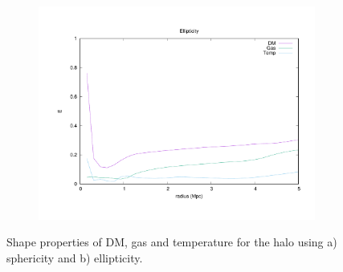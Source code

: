\documentclass[journal]{IEEEtran}
\begin{document}
\begin{figure}[t]
{%
	\begin{subfigure}[t]{0.37\textwidth}
		\centering
		\includegraphics[width=\linewidth]{Ellipticity}
	\end{subfigure}
}
\caption{Shape properties of DM, gas and temperature for the halo using a) sphericity and b) ellipticity.}
\label{fig:shapes}
\end{figure}
\end{document}
